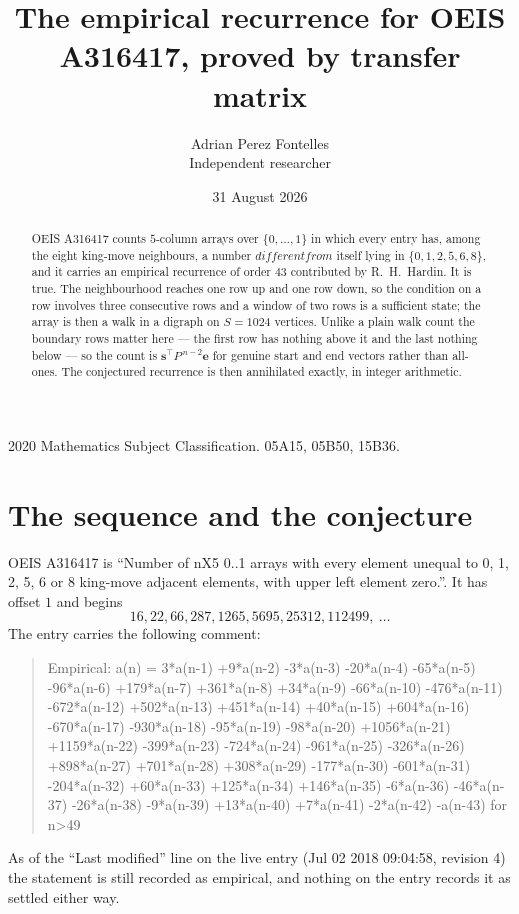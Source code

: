 \documentclass[11pt,a4paper]{article}
\title{The empirical recurrence for OEIS A316417, proved by transfer matrix}
\author{Adrian Perez Fontelles\\ \small Independent researcher}
\date{31 August 2026}
\theoremstyle{plain}
\theoremstyle{definition}
\begin{document}
\maketitle

\begin{abstract}
OEIS A316417 counts $5$-column arrays over $\{0,\dots,1\}$ in which every entry has,
among the eight king-move neighbours, a number $different from$ itself lying in $\{0,1,2,5,6,8\}$, and it carries an empirical
recurrence of order $43$ contributed by R.~H.~Hardin. It is true. The neighbourhood
reaches one row up and one row down, so the condition on a row involves three consecutive
rows and a window of two rows is a sufficient state; the array is then a walk in a digraph
on $S=1024$ vertices. Unlike a plain walk count the boundary rows matter here --- the first
row has nothing above it and the last nothing below --- so the count is
$\mathbf{s}^{\!\top}P^{\,n-2}\mathbf{e}$ for genuine start and end vectors rather than
all-ones. The conjectured recurrence is then annihilated exactly, in integer arithmetic.
\end{abstract}

\noindent\small 2020 Mathematics Subject Classification. 05A15, 05B50, 15B36.\normalsize

\section{The sequence and the conjecture}

OEIS A316417 is ``Number of nX5 0..1 arrays with every element unequal to 0, 1, 2, 5, 6 or 8 king-move adjacent elements, with upper left element zero.''. It has offset
$1$ and begins
\[
16, 22, 66, 287, 1265, 5695, 25312, 112499,\ \dots
\]
The entry carries the following comment:
\begin{quote}\small
Empirical: a(n) = 3*a(n-1) +9*a(n-2) -3*a(n-3) -20*a(n-4) -65*a(n-5) -96*a(n-6) +179*a(n-7) +361*a(n-8) +34*a(n-9) -66*a(n-10) -476*a(n-11) -672*a(n-12) +502*a(n-13) +451*a(n-14) +40*a(n-15) +604*a(n-16) -670*a(n-17) -930*a(n-18) -95*a(n-19) -98*a(n-20) +1056*a(n-21) +1159*a(n-22) -399*a(n-23) -724*a(n-24) -961*a(n-25) -326*a(n-26) +898*a(n-27) +701*a(n-28) +308*a(n-29) -177*a(n-30) -601*a(n-31) -204*a(n-32) +60*a(n-33) +125*a(n-34) +146*a(n-35) -6*a(n-36) -46*a(n-37) -26*a(n-38) -9*a(n-39) +13*a(n-40) +7*a(n-41) -2*a(n-42) -a(n-43) for n>49
\end{quote}
As of the ``Last modified'' line on the live entry (Jul 02 2018 09:04:58, revision
4) the statement is still recorded as empirical, and nothing on the entry
records it as settled either way.
\end{document}
